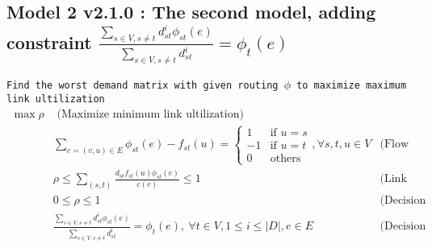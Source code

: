 \documentclass{ctexart}
\begin{document}
\subsection{Model 2 v2.1.0 : The second model, adding constraint $\frac{\sum_{s\in V,s\not=t}d_{st}^i\phi_{st}(e)}{\sum_{s\in V,s\not=t}d_{st}^i}=\phi_t(e)$ }
\texttt{Find the worst demand matrix with given routing $\phi$  to maximize maximum link ultilization} 
\begin{equation}
	\begin{aligned}
		\max \rho & \text{  (Maximize minimum link ultilization)}\\
		& \sum_{e=(v,u)\in E}\phi_{st}(e)-f_{st}(u)=\begin{cases}
			1 &\text{if } u=s \\
			-1 &\text{if } u=t \\
			0 &\text{others} 
		 \end{cases},\forall s,t,u\in V & \text{(Flow conservation)}\\
		& \rho\leq\sum_{(s,t)}\frac{
			d_{st}f_{st}(u)\phi_{st}(e)}{c(e)} \leq 1\ &  \text{(Link capacity constraint)} \\
		& 0\leq\rho\leq1\ & \text{(Decision variable constraint)}\\
		& \frac{\sum_{s\in V,s\not=t}d_{st}^i\phi_{st}(e)}{\sum_{s\in V,s\not=t}d_{st}^i}=\phi_t(e), \ \forall t\in V,1\leq i \leq |\textit{D}|, e\in E & \text{(Decision variable constraint)}
	\end{aligned}
\end{equation}
\end{document}
